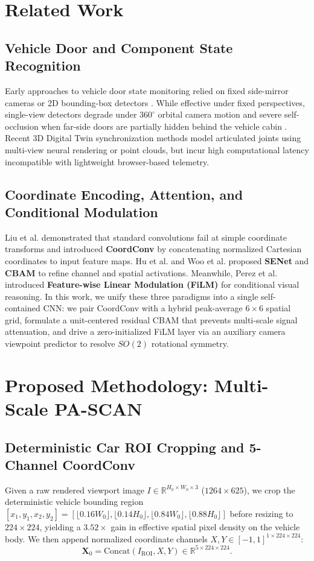 \documentclass[journal]{IEEEtran}
\begin{document}
\section{Related Work}
\subsection{Vehicle Door and Component State Recognition}
Early approaches to vehicle door state monitoring relied on fixed side-mirror cameras or 2D bounding-box detectors \cite{lee2019door,simon2020surrounding}. While effective under fixed perspectives, single-view detectors degrade under $360^\circ$ orbital camera motion and severe self-occlusion when far-side doors are partially hidden behind the vehicle cabin \cite{zhu2021fine}. Recent 3D Digital Twin synchronization methods \cite{wang2022mobility,liu2024articulated} model articulated joints using multi-view neural rendering or point clouds, but incur high computational latency incompatible with lightweight browser-based telemetry.

\subsection{Coordinate Encoding, Attention, and Conditional Modulation}
Liu et al. \cite{liu2018coordconv} demonstrated that standard convolutions fail at simple coordinate transforms and introduced \textbf{CoordConv} by concatenating normalized Cartesian coordinates to input feature maps. Hu et al. \cite{hu2018se} and Woo et al. \cite{woo2018cbam} proposed \textbf{SENet} and \textbf{CBAM} to refine channel and spatial activations. Meanwhile, Perez et al. \cite{perez2018film} introduced \textbf{Feature-wise Linear Modulation (FiLM)} for conditional visual reasoning. In this work, we unify these three paradigms into a single self-contained CNN: we pair CoordConv with a hybrid peak-average $6\times 6$ spatial grid, formulate a unit-centered residual CBAM that prevents multi-scale signal attenuation, and drive a zero-initialized FiLM layer via an auxiliary camera viewpoint predictor to resolve $SO(2)$ rotational symmetry.

\section{Proposed Methodology: Multi-Scale PA-SCAN}
\subsection{Deterministic Car ROI Cropping and 5-Channel CoordConv}
Given a raw rendered viewport image $I \in \mathbb{R}^{H_0 \times W_0 \times 3}$ ($1264 \times 625$), we crop the deterministic vehicle bounding region $[x_1, y_1, x_2, y_2] = [\lfloor 0.16 W_0 \rfloor, \lfloor 0.14 H_0 \rfloor, \lfloor 0.84 W_0 \rfloor, \lfloor 0.88 H_0 \rfloor]$ before resizing to $224 \times 224$, yielding a $3.52\times$ gain in effective spatial pixel density on the vehicle body. We then append normalized coordinate channels $X, Y \in [-1, 1]^{1 \times 224 \times 224}$:
\begin{equation}
\mathbf{X}_0 = \text{Concat}(I_{\text{ROI}}, X, Y) \in \mathbb{R}^{5 \times 224 \times 224}.
\end{equation}
\end{document}
